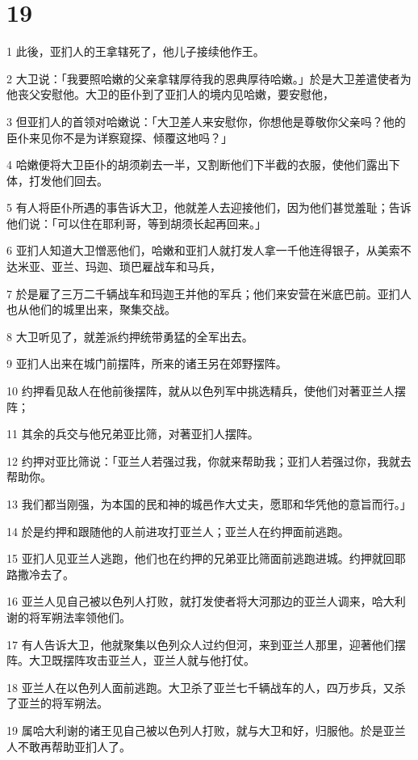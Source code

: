 \chapter{19}

\par 1 此後，亚扪人的王拿辖死了，他儿子接续他作王。
\par 2 大卫说：「我要照哈嫩的父亲拿辖厚待我的恩典厚待哈嫩。」於是大卫差遣使者为他丧父安慰他。大卫的臣仆到了亚扪人的境内见哈嫩，要安慰他，
\par 3 但亚扪人的首领对哈嫩说：「大卫差人来安慰你，你想他是尊敬你父亲吗？他的臣仆来见你不是为详察窥探、倾覆这地吗？」
\par 4 哈嫩便将大卫臣仆的胡须剃去一半，又割断他们下半截的衣服，使他们露出下体，打发他们回去。
\par 5 有人将臣仆所遇的事告诉大卫，他就差人去迎接他们，因为他们甚觉羞耻；告诉他们说：「可以住在耶利哥，等到胡须长起再回来。」
\par 6 亚扪人知道大卫憎恶他们，哈嫩和亚扪人就打发人拿一千他连得银子，从美索不达米亚、亚兰、玛迦、琐巴雇战车和马兵，
\par 7 於是雇了三万二千辆战车和玛迦王并他的军兵；他们来安营在米底巴前。亚扪人也从他们的城里出来，聚集交战。
\par 8 大卫听见了，就差派约押统带勇猛的全军出去。
\par 9 亚扪人出来在城门前摆阵，所来的诸王另在郊野摆阵。
\par 10 约押看见敌人在他前後摆阵，就从以色列军中挑选精兵，使他们对著亚兰人摆阵；
\par 11 其余的兵交与他兄弟亚比筛，对著亚扪人摆阵。
\par 12 约押对亚比筛说：「亚兰人若强过我，你就来帮助我；亚扪人若强过你，我就去帮助你。
\par 13 我们都当刚强，为本国的民和神的城邑作大丈夫，愿耶和华凭他的意旨而行。」
\par 14 於是约押和跟随他的人前进攻打亚兰人；亚兰人在约押面前逃跑。
\par 15 亚扪人见亚兰人逃跑，他们也在约押的兄弟亚比筛面前逃跑进城。约押就回耶路撒冷去了。
\par 16 亚兰人见自己被以色列人打败，就打发使者将大河那边的亚兰人调来，哈大利谢的将军朔法率领他们。
\par 17 有人告诉大卫，他就聚集以色列众人过约但河，来到亚兰人那里，迎著他们摆阵。大卫既摆阵攻击亚兰人，亚兰人就与他打仗。
\par 18 亚兰人在以色列人面前逃跑。大卫杀了亚兰七千辆战车的人，四万步兵，又杀了亚兰的将军朔法。
\par 19 属哈大利谢的诸王见自己被以色列人打败，就与大卫和好，归服他。於是亚兰人不敢再帮助亚扪人了。

